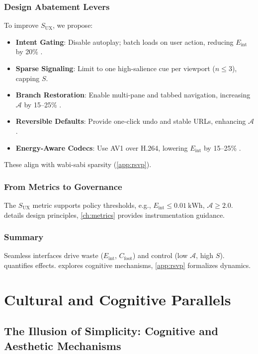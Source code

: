 \documentclass[openany]{book}
\newcommand{\Sent}{S} %
\newcommand{\Eint}{E_{\mathrm{int}}} %
\newcommand{\Cfoot}{C_{\mathrm{foot}}} %
\newcommand{\Auton}{\mathcal{A}} %
\newcommand{\SUX}{S_{\mathrm{UX}}} %
\newcommand{\kWh}{\mathrm{kWh}}
\begin{document}
\section{Design Abatement Levers}
\label{sec:abatement}
To improve \(\SUX\), we propose:
\begin{itemize}
  \item \textbf{Intent Gating}: Disable autoplay; batch loads on user action, reducing \(\Eint\) by 20\% \citep{extentia2024}.
  \item \textbf{Sparse Signaling}: Limit to one high-salience cue per viewport (\(n \leq 3\)), capping \(\Sent\).
  \item \textbf{Branch Restoration}: Enable multi-pane and tabbed navigation, increasing \(\Auton\) by 15--25\% \citep{doctorow2022}.
  \item \textbf{Reversible Defaults}: Provide one-click undo and stable URLs, enhancing \(\Auton\).
  \item \textbf{Energy-Aware Codecs}: Use AV1 over H.264, lowering \(\Eint\) by 15--25\% \citep{extentia2024}.
\end{itemize}
These align with wabi-sabi sparsity (\cref{app:rsvp}).

\section{From Metrics to Governance}
\label{sec:governance-preview}
The \(\SUX\) metric supports policy thresholds, e.g., \(\Eint \leq \SI{0.01}{\kWh}\), \(\Auton \geq 2.0\).  details design principles, \cref{ch:metrics} provides instrumentation guidance.

\section{Summary}
Seamless interfaces drive waste (\(\Eint\), \(\Cfoot\)) and control (low \(\Auton\), high \(\Sent\)).  quantifies effects.  explores cognitive mechanisms, \cref{app:rsvp} formalizes dynamics.

\part{Cultural and Cognitive Parallels}

\chapter{The Illusion of Simplicity: Cognitive and Aesthetic Mechanisms}
\label{ch:illusion}
\end{document}
